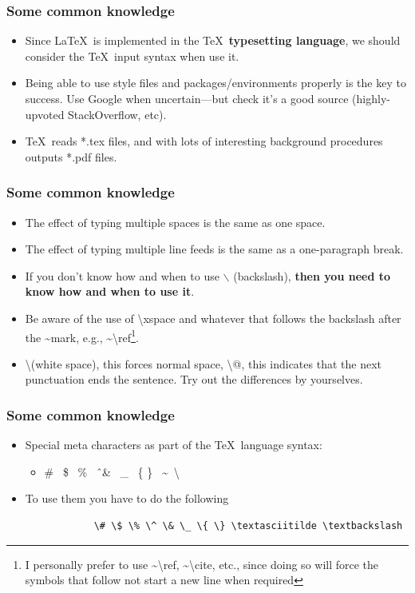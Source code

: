 \documentclass[11pt]{beamer}
\begin{document}
\begin{frame}
	\frametitle{Some common knowledge}

	\begin{itemize}
		\item Since \LaTeX \ is implemented in the \TeX \ \textbf{typesetting language}, we should consider the \TeX \ input syntax when use it.
		\item Being able to use style files and packages/environments properly is the key to success. Use Google when uncertain---but check it's a good source (highly-upvoted StackOverflow, etc).
		\item \TeX \ reads *.tex files, and with lots of interesting background procedures outputs *.pdf files. 
	\end{itemize}
	
\end{frame}

\begin{frame}
	\frametitle{Some common knowledge}
	
	\begin{itemize}
		\item The effect of typing multiple spaces is the same as one space.
		\item The effect of typing multiple line feeds is the same as a one-paragraph break.
		\item If you don't know how and when to use $\backslash$ (backslash), \textbf{then you need to know how and when to use it}.
		\item Be aware of the use of \textbackslash xspace and whatever that follows the backslash after the \textasciitilde mark, e.g., \textasciitilde \textbackslash ref\footnote{I personally prefer to use \textasciitilde \textbackslash ref, \textasciitilde \textbackslash cite, etc., since doing so will force the symbols that follow not start a new line when required}.
		\item \textbackslash(white space), this forces normal space, \textbackslash @, this indicates that the next punctuation ends the sentence. Try out the differences by yourselves.
	\end{itemize}
	
\end{frame}

\begin{frame}[containsverbatim]
	\frametitle{Some common knowledge}

	\begin{itemize}
		\item Special meta characters as part of the \TeX \  language syntax:
		\begin{itemize}
			\item \# \ \$ \ \% \ \^ \ \& \ \_ \ \{ \} \ \textasciitilde \  \textbackslash
		\end{itemize}
		\item To use them you have to do the following
			\begin{verbatim}
			\# \$ \% \^ \& \_ \{ \} \textasciitilde \textbackslash
			\end{verbatim}
	\end{itemize}

\end{frame}
\end{document}
